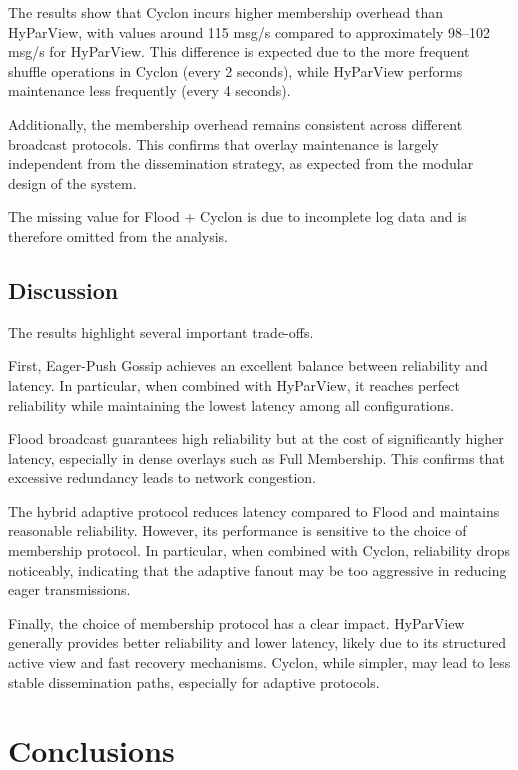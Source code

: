 \documentclass[sigconf,a4paper]{acmart}
\begin{document}
The results show that Cyclon incurs higher membership overhead than
HyParView, with values around 115 msg/s compared to approximately
98–102 msg/s for HyParView. This difference is expected due to the
more frequent shuffle operations in Cyclon (every 2 seconds), while
HyParView performs maintenance less frequently (every 4 seconds).

Additionally, the membership overhead remains consistent across
different broadcast protocols. This confirms that overlay maintenance
is largely independent from the dissemination strategy, as expected
from the modular design of the system.

The missing value for Flood + Cyclon is due to incomplete log data
and is therefore omitted from the analysis.

\subsection{Discussion}

The results highlight several important trade-offs.

First, Eager-Push Gossip achieves an excellent balance between reliability
and latency. In particular, when combined with HyParView, it reaches perfect
reliability while maintaining the lowest latency among all configurations.

Flood broadcast guarantees high reliability but at the cost of significantly
higher latency, especially in dense overlays such as Full Membership. This
confirms that excessive redundancy leads to network congestion.

The hybrid adaptive protocol reduces latency compared to Flood and maintains
reasonable reliability. However, its performance is sensitive to the choice
of membership protocol. In particular, when combined with Cyclon, reliability
drops noticeably, indicating that the adaptive fanout may be too aggressive
in reducing eager transmissions.

Finally, the choice of membership protocol has a clear impact. HyParView
generally provides better reliability and lower latency, likely due to its
structured active view and fast recovery mechanisms. Cyclon, while simpler,
may lead to less stable dissemination paths, especially for adaptive
protocols.

\section{Conclusions}
\label{sec:conclusions}
\end{document}
